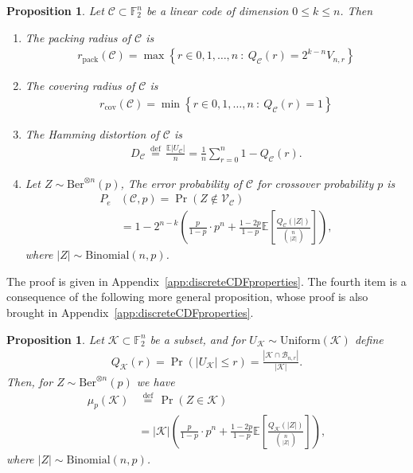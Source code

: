 \documentclass[article,doublecolumn]{IEEEtran}
\newcommand{\F}{{\mathbb{F}}}
\newcommand{\EE}{{\mathbb{E}}}
\newcommand{\df}{{\, \stackrel{\mathrm{def}}{=}\, }}
\newcommand{\BB}{{\mathcal{B}}}
\newcommand{\CC}{{\mathcal{C}}}
\newcommand{\Unif}{\mathrm{Uniform}}
\newcommand{\KK}{{\mathcal{K}}}
\newcommand{\rpack}{{r_{\mathrm{pack}}}}
\newcommand{\rcov}{{r_{\mathrm{cov}}}}
\newcommand{\VC}{\mathcal{V}_{\mathcal{C}}}
\newtheorem{prop}[thm]{Proposition}
\begin{document}
\begin{prop}
\label{prop:LC_fundviacdf}
Let $\CC\subset \F_2^n$ be a linear code of dimension $0\leq k\leq n$. Then
\begin{enumerate}
    \item The packing radius of $\CC$ is
    \begin{align}
     \rpack(\CC)=\max\left\{r\in 0,1,\ldots,n~:~Q_\CC(r)= 2^{k-n}V_{n,r} \right\}  
    \end{align}
    \item The covering radius of $\CC$ is
    \begin{align}
     \rcov(\CC)=\min\left\{r\in 0,1,\ldots,n~:~Q_\CC(r)= 1 \right\}  
    \end{align}
    \item The Hamming distortion of $\CC$ is
    \begin{align}
     D_\CC\df \frac{\EE|U_\CC|}{n}=\frac{1}{n}\sum_{r=0}^{n} 1-Q_{\CC}(r).
    \end{align}
    \label{fund:DLN}
    \item Let $Z\sim\mathrm{Ber}^{\otimes n}(p)$, The error probability of $\CC$ for crossover probability $p$ is 
    \begin{align}
     P_e&(\CC,p)=\Pr(Z \notin \VC)\nonumber\\
     &=1- 2^{n-k}\left(\frac{p}{1-p}\cdot p^n+ \frac{1-2p}{1-p}\EE\left[\frac{Q_{\CC}(|Z|)}{{{n}\choose{|Z|}}}\right]\right), 
    \end{align}
    where $|Z|\sim\mathrm{Binomial}(n,p)$.
    \label{fund:BerPe}
\end{enumerate}
\end{prop}

The proof is given in Appendix~\ref{app:discreteCDFproperties}. The fourth item is a consequence of the following more general proposition, whose proof is also brought in Appendix~\ref{app:discreteCDFproperties}.

\begin{prop}
Let $\KK\subset \F_2^n$ be a subset, and for $U_\KK\sim\Unif(\KK)$ define
\begin{align}
Q_\KK(r)=\Pr(|U_\KK|\leq r)=\frac{|\KK\cap \BB_{n,r}|}{|\KK|}.    \label{eq:genCDF_LC}
\end{align}
Then, for $Z\sim\mathrm{Ber}^{\otimes n}(p)$ we have
\begin{align}
\mu_p(\KK)&\df \Pr(Z\in\KK)\nonumber\\
&=|\KK|\left(\frac{p}{1-p}\cdot p^n+ \frac{1-2p}{1-p}\EE\left[\frac{Q_\KK(|Z|)}{{{n}\choose{|Z|}}}\right]\right),    
\end{align}
where $|Z|\sim\mathrm{Binomial}(n,p)$.
\label{prop:ProbAsCQFexpt_dicrtete}    
\end{prop}
\end{document}
